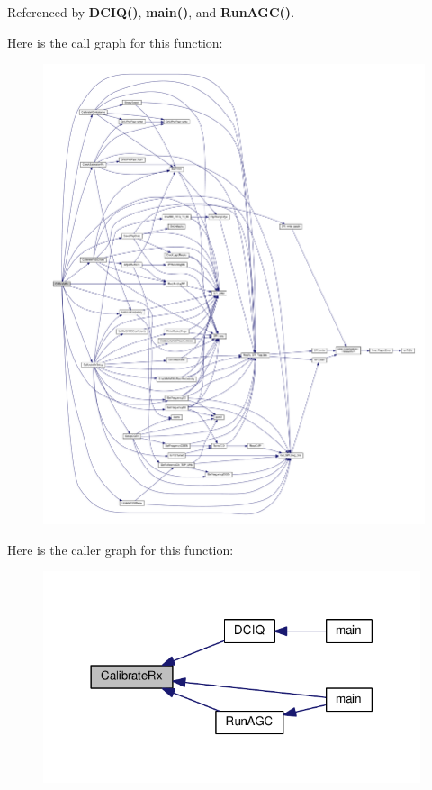 Referenced by {\bf D\+C\+I\+Q()}, {\bf main()}, and {\bf Run\+A\+G\+C()}.



Here is the call graph for this function\+:
\nopagebreak
\begin{figure}[H]
\begin{center}
\leavevmode
\includegraphics[width=350pt]{d3/dec/lms7002m__calibrations_8c_a69b1e143409bc9a1c0b53f360bf608cf_cgraph}
\end{center}
\end{figure}




Here is the caller graph for this function\+:
\nopagebreak
\begin{figure}[H]
\begin{center}
\leavevmode
\includegraphics[width=314pt]{d3/dec/lms7002m__calibrations_8c_a69b1e143409bc9a1c0b53f360bf608cf_icgraph}
\end{center}
\end{figure}


